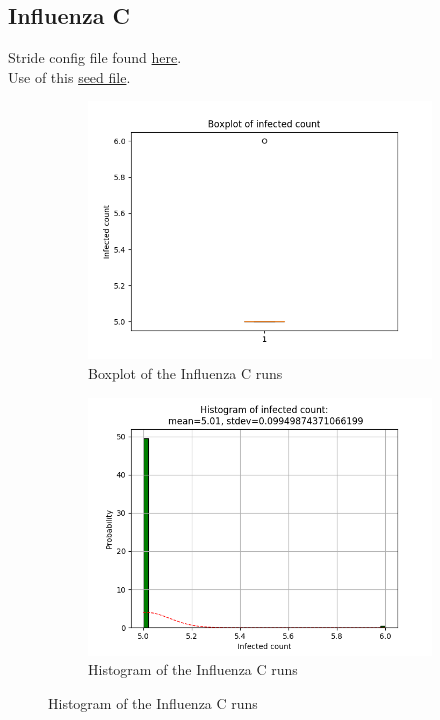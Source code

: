 \documentclass[a4paper]{article}
\begin{document}
\subsection{Influenza C}
Stride config file found \href{https://github.com/RobbeHeirman/Configs/blob/master/config/run_random-geopop_nolog-influC.xml}{here}.\\
Use of this \href{https://github.com/RobbeHeirman/Configs/blob/master/100-random.txt}{seed file}.
\\

\begin{figure}[H]
\centering
\begin{subfigure}{.5\textwidth}
  \centering
  \includegraphics[width=1\linewidth]{Influenza_C/Influenza_C-boxplot.png}
  \caption{Boxplot of the Influenza C runs}
  \label{fig:Boxplot_Influenza_C}
\end{subfigure}%
\begin{subfigure}{.5\textwidth}
  \centering
  \includegraphics[width=1\linewidth]{Influenza_C/Influenza_C-histogram.png}
  \caption{Histogram of the Influenza C runs}
  \label{fig:Histogram_Influenza_C}
\end{subfigure}


\end{figure}
\end{document}
